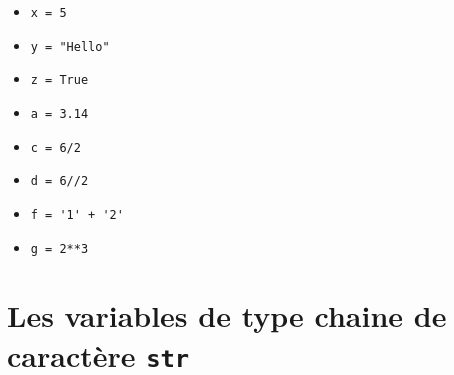\begin{exercice_cours}
	\begin{minipage}{0.48\linewidth}
		\begin{itemize}
		\item \verb~x = 5~
		\item \verb~y = "Hello"~
		\item \verb~z = True~
		\item \verb~a = 3.14~
	\end{itemize}
	\end{minipage}\hfill{}
	\begin{minipage}{0.48\linewidth}
	\begin{itemize}
		\item \verb~c = 6/2~
		\item \verb~d = 6//2~
		\item \verb~f = '1' + '2'~
		\item \verb~g = 2**3~
	\end{itemize}
\end{minipage}
	
\end{exercice_cours}


\medskip

\section{Les variables de type chaine de caractère \texttt{str}}


